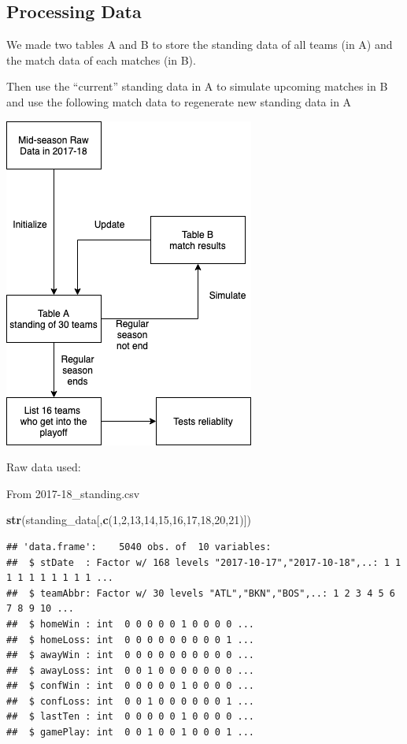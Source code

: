 \documentclass[]{article}
\newenvironment{Shaded}{\begin{snugshade}}{\end{snugshade}}
\newcommand{\DecValTok}[1]{\textcolor[rgb]{0.00,0.00,0.81}{#1}}
\newcommand{\KeywordTok}[1]{\textcolor[rgb]{0.13,0.29,0.53}{\textbf{#1}}}
\newcommand{\NormalTok}[1]{#1}
\begin{document}
\hypertarget{processing-data}{%
\subsection{Processing Data}\label{processing-data}}

We made two tables A and B to store the standing data of all teams (in
A) and the match data of each matches (in B).

Then use the ``current'' standing data in A to simulate upcoming matches
in B and use the following match data to regenerate new standing data in
A

\begin{center}\includegraphics{methods_flowchart} \end{center}

Raw data used:

From 2017-18\_standing.csv

\begin{Shaded}
\begin{Highlighting}[]
\KeywordTok{str}\NormalTok{(standing_data[,}\KeywordTok{c}\NormalTok{(}\DecValTok{1}\NormalTok{,}\DecValTok{2}\NormalTok{,}\DecValTok{13}\NormalTok{,}\DecValTok{14}\NormalTok{,}\DecValTok{15}\NormalTok{,}\DecValTok{16}\NormalTok{,}\DecValTok{17}\NormalTok{,}\DecValTok{18}\NormalTok{,}\DecValTok{20}\NormalTok{,}\DecValTok{21}\NormalTok{)])}
\end{Highlighting}
\end{Shaded}

\begin{verbatim}
## 'data.frame':    5040 obs. of  10 variables:
##  $ stDate  : Factor w/ 168 levels "2017-10-17","2017-10-18",..: 1 1 1 1 1 1 1 1 1 1 ...
##  $ teamAbbr: Factor w/ 30 levels "ATL","BKN","BOS",..: 1 2 3 4 5 6 7 8 9 10 ...
##  $ homeWin : int  0 0 0 0 0 1 0 0 0 0 ...
##  $ homeLoss: int  0 0 0 0 0 0 0 0 0 1 ...
##  $ awayWin : int  0 0 0 0 0 0 0 0 0 0 ...
##  $ awayLoss: int  0 0 1 0 0 0 0 0 0 0 ...
##  $ confWin : int  0 0 0 0 0 1 0 0 0 0 ...
##  $ confLoss: int  0 0 1 0 0 0 0 0 0 1 ...
##  $ lastTen : int  0 0 0 0 0 1 0 0 0 0 ...
##  $ gamePlay: int  0 0 1 0 0 1 0 0 0 1 ...
\end{verbatim}
\end{document}
